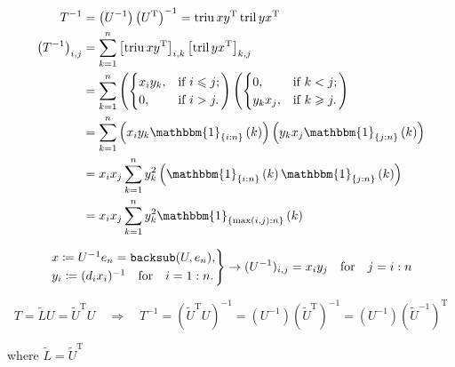 \documentclass[11pt]{article}
\newcommand{\triu}{\mathop{\mathrm{triu}}}
\newcommand{\tril}{\mathop{\mathrm{tril}}}
\newcommand{\T}{\mathrm{T}}
\begin{document}
\begin{align}
    T^{-1} &= \left(U^{-1}\right)\left(U^{\T}\right)^{-1} = \triu{x y^{\T}} \tril{y x^{\T}} \nonumber\\
    \left( T^{-1} \right)_{i,j} &= \sum_{k=1}^{n} 
            \left[\triu{x y^{\T}}\right]_{i,k}
            \left[\tril{y x^{\T}}\right]_{k,j} \nonumber\\
        &= \sum_{k=1}^{n}
            \left( \begin{cases}
                x_{i} y_{k} ,&  \text{if } i \leqslant j ; \\ 
                0           ,&  \text{if } i > j .
                   \end{cases}\right)
            \left( \begin{cases}
                0           ,&  \text{if } k < j ; \\ 
                y_{k} x_{j} ,&  \text{if } k \geqslant j .
                   \end{cases}\right) \nonumber\\
        &= \sum_{k=1}^{n}
            \left(x_{i} y_{k} \mathbbm{1}_{\{i:n\}}\left( k \right)\right)
            \left(y_{k} x_{j} \mathbbm{1}_{\{j:n\}}\left( k \right)\right) \nonumber\\
        &= x_{i} x_{j} \sum_{k=1}^{n}
            y_{k}^2 \left( \mathbbm{1}_{\{i:n\}}\left( k \right)
            \mathbbm{1}_{\{j:n\}}\left( k \right)\right) \nonumber\\
        &= x_{i} x_{j} \sum_{k=1}^{n}
            y_{k}^2 \mathbbm{1}_{\{\max\left(i,j \right):n\}}\left( k \right)
\end{align}




\begin{equation*}
    \begin{rcases*}
    x \coloneqq U^{-1} e_n = \texttt{backsub}(U, e_n), \\
    y_{i} \coloneqq (d_{i} x_{i})^{-1} \qfor i=1:n.
\end{rcases*} \rightarrow (U^{-1})_{i,j} = x_i y_j \qfor j=i:n
\end{equation*}

\newpage



\begin{equation*}
    T = \tilde{L} U = \tilde{U}^{\T} U \quad \Rightarrow \quad 
        T^{-1} = \left(\tilde{U}^{\T} U\right)^{-1}= \left(U^{-1}\right)\left(\tilde{U}^{\T}\right)^{-1}
        = \left(U^{-1}\right)\left(\tilde{U}^{-1}\right)^{\T}
\end{equation*}\par
where $\tilde{L} = \tilde{U}^{\T}$
\end{document}
